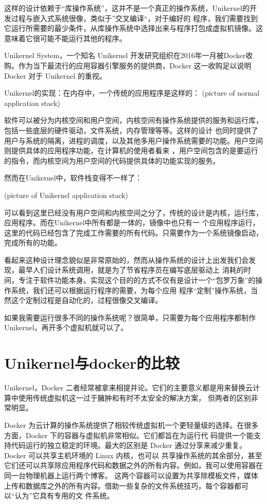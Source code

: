这样的设计依赖于“库操作系统”，这并不是一个真正的操作系统，Unikernel的开发过程与嵌入式系统很像，类似于”交叉编译“，对于编好的
程序，我们需要找到它运行所需要的最少条件，从库操作系统中选择出来与程序打包成虚拟机镜像。这意味着它很可能不能运行其他的程序。

Unikernel System，一个知名 Unikernel 开发研究组织在2016年一月被Docker收购。作为当下最流行的应用容器引擎服务的提供商，Docker 
这一收购足以说明 Docker 对于 Unikernel 的重视。

Unikernel的实现：在内存中，一个传统的应用程序是这样的：
(picture of normal application stack)

软件可以被分为内核空间和用户空间，内核空间有操作系统提供的服务和运行库，包括一些底层的硬件驱动，文件系统，内存管理等等。这样的设计
也同时提供了用户与系统的隔离，进程的调度，以及其他多用户操作系统需要的功能。用户空间则提供具体的应用程序功能，在计算机的使用者看来
，用户空间包含的是要运行的指令，而内核空间为用户空间的代码提供具体的功能实现的服务。

然而在Unikernel中，软件栈变得不一样了：

(picture of Unikernel application stack)

可以看到这里已经没有用户空间和内核空间之分了，传统的设计是内核，运行库，应用程序。而在Unikernel中所有都是一体的，镜像中也只有一
个应用程序运行，这里的代码已经包含了完成工作需要的所有代码。只需要作为一个系统镜像启动，完成所有的功能。

看起来这种设计理念貌似是非常原始的，然而从操作系统的设计上出发我们会发现，最早人们设计系统调用，就是为了节省程序员在编写底层驱动上
消耗的时间，专注于软件功能本身。实现这个目的的方式不仅有是设计一个“包罗万象”的操作系统，我们还可以根据运行程序的需要，为每个应用
程序“定制”操作系统，当然这个定制过程是自动化的，过程很像交叉编译。

如果我需要运行很多不同的操作系统呢？很简单，只需要为每个应用程序都制作Unikernel，再开多个虚拟机就可以了。

\section{Unikernel与docker的比较}

Unikernel，Docker 二者经常被拿来相提并论。它们的主要意义都是用来替换云计算中使用传统虚拟机这一过于臃肿和有时不太安全的解决方案，
但两者的区别非常明显。

Docker 为云计算的操作系统提供了相较传统虚拟机一个更轻量级的选择。在很多方面，Docker 下的容器与虚拟机非常相似。它们都旨在为运行代
码提供一个能支持代码运行的独立稳定的环境。最大的区别是 Docker 通过分享来减少重复。Docker 可以共享主机环境的 Linux 内核，也可以
共享操作系统的其余部分，甚至它们还可以共享除应用程序代码和数据之外的所有内容。例如，我可以使用容器在同一台物理机器上运行两个博客。
这两个容器可以设置为共享除模板文件，媒体上传和数据库之外的所有内容。借助一些复杂的文件系统技巧，每个容器都可以“认为”它具有专用的文
件系统。
